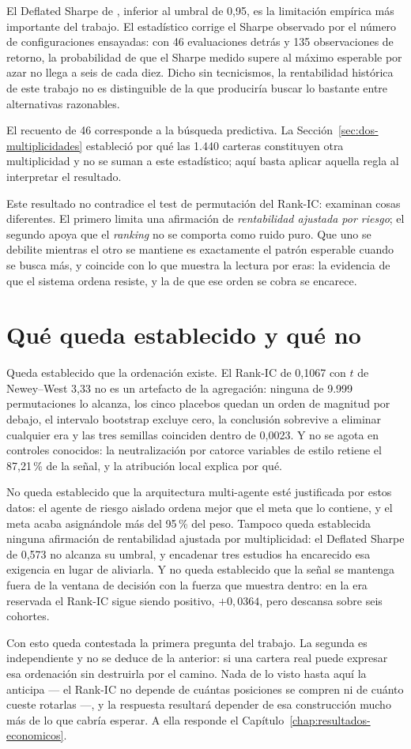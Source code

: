 El Deflated Sharpe de \ProbabilidadDSR{}, inferior al umbral de 0,95, es la limitación empírica más importante del
trabajo. El estadístico corrige el Sharpe observado por el número de configuraciones ensayadas: con
46 evaluaciones detrás y 135 observaciones de retorno, la probabilidad de que el Sharpe medido supere
al máximo esperable por azar no llega a seis de cada diez. Dicho sin tecnicismos, la rentabilidad
histórica de este trabajo no es distinguible de la que produciría buscar lo bastante entre
alternativas razonables.

El recuento de 46 corresponde a la búsqueda predictiva. La Sección~\ref{sec:dos-multiplicidades}
estableció por qué las 1.440 carteras constituyen otra multiplicidad y no se suman a este
estadístico; aquí basta aplicar aquella regla al interpretar el resultado.

Este resultado no contradice el test de permutación del Rank-IC: examinan cosas diferentes. El
primero limita una afirmación de \emph{rentabilidad ajustada por riesgo}; el segundo apoya que el
\emph{ranking} no se comporta como ruido puro. Que uno se debilite mientras el otro se mantiene es
exactamente el patrón esperable cuando se busca más, y coincide con lo que muestra la lectura por
eras: la evidencia de que el sistema ordena resiste, y la de que ese orden se cobra se encarece.

\section{Qué queda establecido y qué no}

Queda establecido que la ordenación existe. El Rank-IC de 0,1067 con $t$ de Newey--West 3,33 no es
un artefacto de la agregación: ninguna de 9.999 permutaciones lo alcanza, los cinco placebos quedan
un orden de magnitud por debajo, el intervalo bootstrap excluye cero, la conclusión sobrevive a
eliminar cualquier era y las tres semillas coinciden dentro de 0,0023. Y no se agota en controles
conocidos: la neutralización por catorce variables de estilo retiene el 87,21\,\% de la señal, y la
atribución local explica por qué.

No queda establecido que la arquitectura multi-agente esté justificada por estos datos: el agente
de riesgo aislado ordena mejor que el meta que lo contiene, y el meta acaba asignándole más del
95\,\% del peso. Tampoco queda establecida ninguna afirmación de rentabilidad ajustada por
multiplicidad: el Deflated Sharpe de 0,573 no alcanza su umbral, y encadenar tres estudios ha
encarecido esa exigencia en lugar de aliviarla. Y no queda establecido que la señal se mantenga
fuera de la ventana de decisión con la fuerza que muestra dentro: en la era reservada el Rank-IC
sigue siendo positivo, $+0{,}0364$, pero descansa sobre seis cohortes.

Con esto queda contestada la primera pregunta del trabajo. La segunda es independiente y no se
deduce de la anterior: si una cartera real puede expresar esa ordenación sin destruirla por el
camino. Nada de lo visto hasta aquí la anticipa --- el Rank-IC no depende de cuántas posiciones se
compren ni de cuánto cueste rotarlas ---, y la respuesta resultará depender de esa construcción
mucho más de lo que cabría esperar. A ella responde el Capítulo~\ref{chap:resultados-economicos}.
